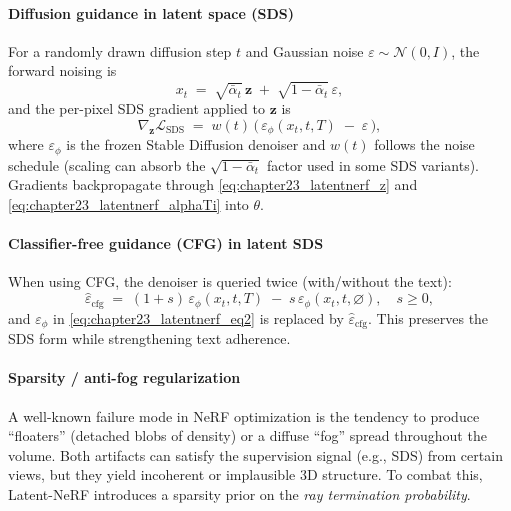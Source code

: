 \begin{enrichment}
\begin{enrichment}
        \paragraph{Diffusion guidance in latent space (SDS)}
        For a randomly drawn diffusion step $t$ and Gaussian noise $\varepsilon\!\sim\!\mathcal{N}(0,I)$, the forward noising is
        \begin{equation}
            x_t \;=\; \sqrt{\bar\alpha_t}\,\mathbf{z} \;+\; \sqrt{1-\bar\alpha_t}\,\varepsilon,
            \label{eq:chapter23_latentnerf_eq1}
        \end{equation}
        and the per-pixel SDS gradient applied to $\mathbf{z}$ is
        \begin{equation}
            \nabla_{\mathbf{z}} \mathcal{L}_{\mathrm{SDS}}
            \;=\;
            w(t)\,\big(\,\varepsilon_\phi(x_t,t,T)\;-\;\varepsilon\,\big),
            \label{eq:chapter23_latentnerf_eq2}
        \end{equation}
        where $\varepsilon_\phi$ is the frozen Stable Diffusion denoiser and $w(t)$ follows the noise schedule (scaling can absorb the $\sqrt{1-\bar\alpha_t}$ factor used in some SDS variants). Gradients backpropagate through \eqref{eq:chapter23_latentnerf_z} and \eqref{eq:chapter23_latentnerf_alphaTi} into $\theta$.
        
        \paragraph{Classifier-free guidance (CFG) in latent SDS}
        When using CFG, the denoiser is queried twice (with/without the text):
        \begin{equation}
            \hat\varepsilon_{\mathrm{cfg}}
            \;=\;
            (1+s)\,\varepsilon_\phi(x_t,t,T)\;-\;s\,\varepsilon_\phi(x_t,t,\varnothing),
            \quad s\ge 0,
            \label{eq:chapter23_latentnerf_cfg}
        \end{equation}
        and $\varepsilon_\phi$ in \eqref{eq:chapter23_latentnerf_eq2} is replaced by $\hat\varepsilon_{\mathrm{cfg}}$. This preserves the SDS form while strengthening text adherence.
        
        \paragraph{Sparsity / anti-fog regularization}
        A well-known failure mode in NeRF optimization is the tendency to produce ``floaters'' (detached blobs of density) or a diffuse ``fog'' spread throughout the volume. Both artifacts can satisfy the supervision signal (e.g., SDS) from certain views, but they yield incoherent or implausible 3D structure. To combat this, Latent-NeRF introduces a sparsity prior on the \emph{ray termination probability}.
        

\end{enrichment}
\end{enrichment}
